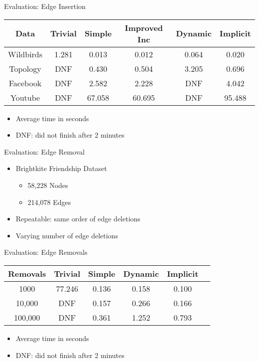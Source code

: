 \documentclass{beamer}
\begin{document}
\begin{frame}{Evaluation: Edge Insertion}
  \begin{table}[]
  \begin{tabular}{|c|c|c|c|c|c|}
    \hline
    Data & Trivial & Simple & Improved Inc & Dynamic & Implicit \\
    \hline
    \hline
    Wildbirds & 1.281 & 0.013 & 0.012 & 0.064 & 0.020 \\
    \hline
    Topology & DNF & 0.430 & 0.504 & 3.205 & 0.696 \\
    \hline
    Facebook & DNF & 2.582 & 2.228 & DNF & 4.042 \\
    \hline
    Youtube & DNF & 67.058 & 60.695 & DNF & 95.488 \\
    \hline
  \end{tabular}
  \end{table}
  \begin{itemize}
    \item Average time in seconds
    \item DNF: did not finish after 2 minutes
  \end{itemize}
\end{frame}


\begin{frame}{Evaluation: Edge Removal}
  \begin{itemize}
    \item Brightkite Friendship Dataset
      \begin{itemize}
        \item 58,228 Nodes
        \item 214,078 Edges
      \end{itemize}
    \item Repeatable: same order of edge deletions
    \item Varying number of edge deletions
  \end{itemize}
\end{frame}

\begin{frame}{Evaluation: Edge Removals}
  \begin{table}[]
  \begin{tabular}{|c|c|c|c|c|c|}
    \hline
    Removals & Trivial & Simple & Dynamic & Implicit \\
    \hline
    \hline
    1000 & 77.246 & 0.136 & 0.158 & 0.100 \\ %
    \hline
    10,000 & DNF & 0.157 & 0.266 & 0.166 \\
    \hline
    100,000 & DNF & 0.361 & 1.252 & 0.793 \\
    \hline
  \end{tabular}
  \end{table}
  \begin{itemize}
    \item Average time in seconds
    \item DNF: did not finish after 2 minutes
  \end{itemize}
\end{frame}
\end{document}
